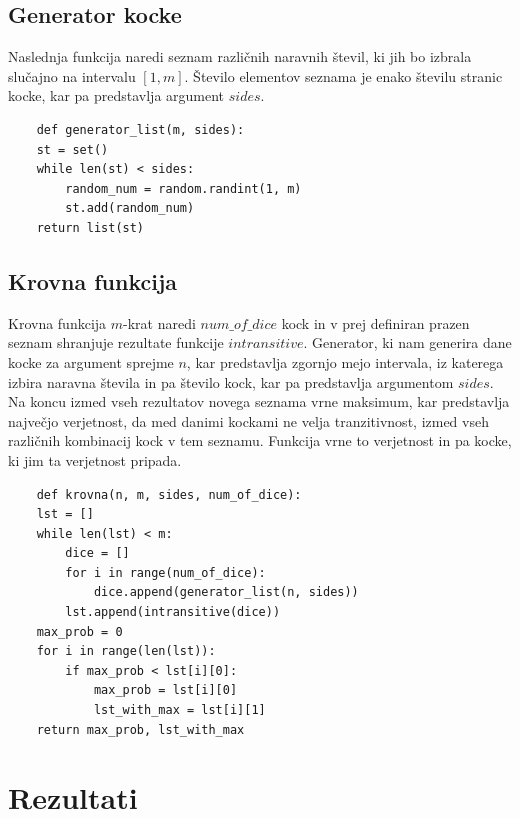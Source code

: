 \documentclass[12pt,a4paper]{amsart}
\begin{document}
 \subsection{Generator kocke}
 Naslednja funkcija naredi seznam različnih naravnih števil, ki jih bo izbrala slučajno na intervalu $\left[1,m\right]$. 
 Število elementov seznama je enako številu stranic kocke, kar pa predstavlja argument $sides$.
 \begin{verbatim}
    def generator_list(m, sides):
    st = set()
    while len(st) < sides:
        random_num = random.randint(1, m)
        st.add(random_num)
    return list(st)
 \end{verbatim}

 \subsection{Krovna funkcija}
 Krovna funkcija $m$-krat naredi $num\_of\_dice$ kock in v prej definiran prazen seznam shranjuje rezultate funkcije $intransitive$. 
 Generator, ki nam generira dane kocke za argument sprejme $n$, kar predstavlja zgornjo mejo intervala, iz katerega izbira naravna števila in pa število kock, kar pa predstavlja argumentom $sides$.
 Na koncu izmed vseh rezultatov novega seznama vrne maksimum, kar predstavlja največjo verjetnost, da med danimi kockami ne velja tranzitivnost, izmed vseh različnih kombinacij kock v tem seznamu.
 Funkcija vrne to verjetnost in pa kocke, ki jim ta verjetnost pripada.
\begin{verbatim}
    def krovna(n, m, sides, num_of_dice):  
    lst = []
    while len(lst) < m: 
        dice = []
        for i in range(num_of_dice):
            dice.append(generator_list(n, sides))
        lst.append(intransitive(dice))
    max_prob = 0
    for i in range(len(lst)):
        if max_prob < lst[i][0]:
            max_prob = lst[i][0]
            lst_with_max = lst[i][1]
    return max_prob, lst_with_max
 \end{verbatim}
 \pagebreak
 \section{Rezultati}
\end{document}
